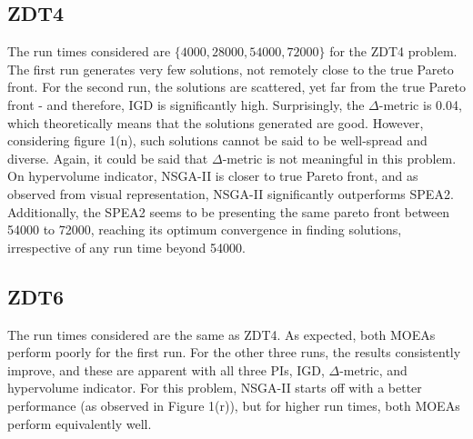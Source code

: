 \documentclass[sigconf, nonacm, preprint]{acmart}
\begin{document}
\subsection{ZDT4}
The run times considered are $\{4000, 28000, 54000, 72000\}$ for the ZDT4 problem. The first run generates very few solutions, not remotely close to the true Pareto front. For the second run, the solutions are scattered, yet far from the true Pareto front - and therefore, IGD is significantly high. Surprisingly, the $\Delta$-metric is 0.04, which theoretically means that the solutions generated are good. However, considering figure 1(n), such solutions cannot be said to be well-spread and diverse. Again, it could be said that $\Delta$-metric is not meaningful in this problem. On hypervolume indicator, NSGA-II is closer to true Pareto front, and as observed from visual representation, NSGA-II significantly outperforms SPEA2. Additionally, the SPEA2 seems to be presenting the same pareto front between 54000 to 72000, reaching its optimum convergence in finding solutions, irrespective of any run time beyond 54000.
\subsection{ZDT6}
The run times considered are the same as ZDT4. As expected, both MOEAs perform poorly for the first run. For the other three runs, the results consistently improve, and these are apparent with all three PIs, IGD, $\Delta$-metric, and hypervolume indicator. For this problem, NSGA-II starts off with a better performance (as observed in Figure 1(r)), but for higher run times, both MOEAs perform equivalently well.
\end{document}
